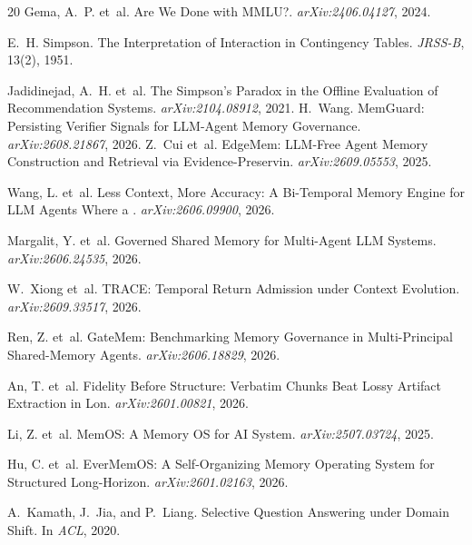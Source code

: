 \documentclass[10pt]{article}
\begin{document}
\begin{thebibliography}{20}
Gema, A.~P. et~al.
\newblock Are We Done with MMLU?. \newblock \emph{arXiv:2406.04127}, 2024.

E.~H. Simpson.
\newblock The Interpretation of Interaction in Contingency Tables.
\newblock \emph{JRSS-B}, 13(2), 1951.

Jadidinejad, A.~H. et~al.
\newblock The Simpson's Paradox in the Offline Evaluation of Recommendation Systems.
\newblock \emph{arXiv:2104.08912}, 2021.
H.~Wang.
\newblock MemGuard: Persisting Verifier Signals for LLM-Agent Memory Governance. \newblock \emph{arXiv:2608.21867}, 2026.
Z.~Cui et~al.
\newblock EdgeMem: LLM-Free Agent Memory Construction and Retrieval via Evidence-Preservin. \newblock \emph{arXiv:2609.05553}, 2025.

Wang, L. et~al.
\newblock Less Context, More Accuracy: A Bi-Temporal Memory Engine for LLM Agents Where a . \newblock \emph{arXiv:2606.09900}, 2026.

Margalit, Y. et~al.
\newblock Governed Shared Memory for Multi-Agent LLM Systems. \newblock \emph{arXiv:2606.24535}, 2026.

W.~Xiong et~al.
\newblock TRACE: Temporal Return Admission under Context Evolution. \newblock \emph{arXiv:2609.33517}, 2026.

Ren, Z. et~al.
\newblock GateMem: Benchmarking Memory Governance in Multi-Principal Shared-Memory Agents. \newblock \emph{arXiv:2606.18829}, 2026.

An, T. et~al.
\newblock Fidelity Before Structure: Verbatim Chunks Beat Lossy Artifact Extraction in Lon. \newblock \emph{arXiv:2601.00821}, 2026.

Li, Z. et~al.
\newblock MemOS: A Memory OS for AI System. \newblock \emph{arXiv:2507.03724}, 2025.

Hu, C. et~al.
\newblock EverMemOS: A Self-Organizing Memory Operating System for Structured Long-Horizon. \newblock \emph{arXiv:2601.02163}, 2026.

A.~Kamath, J.~Jia, and P.~Liang.
\newblock Selective Question Answering under Domain Shift.
\newblock In \emph{ACL}, 2020.


\end{thebibliography}
\end{document}
